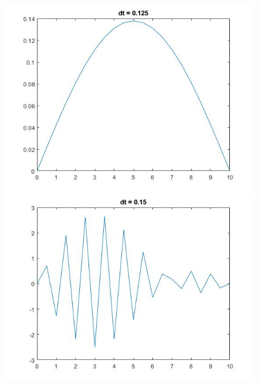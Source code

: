 \begin{figure}
\begin{minipage}{0.5\textwidth}
\end{minipage} \\
\begin{minipage}{0.5\textwidth}
\includegraphics[width = \textwidth]{2.jpg}
\end{minipage}
\begin{minipage}{0.5\textwidth}
\includegraphics[width = \textwidth]{3.jpg}
\end{minipage} \\
\begin{minipage}{0.5\textwidth}

\end{minipage}
\end{figure}
